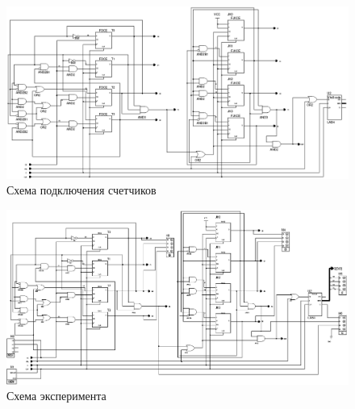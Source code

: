 \documentclass[a4paper,12pt]{article}
\begin{document}
\newpage
\begin{landscape}
\begin{figure}[!htb]
	\caption{Схема подключения счетчиков}
	\label{fig:sch}
	\includegraphics[scale=0.65]{lab4sch}
\end{figure}
\begin{figure}[!htb]
	\caption{Схема эксперимента}
	\label{fig:exp}
	\includegraphics[scale=0.64]{lab4sexp}
\end{figure}
\end{landscape}
\end{document}
